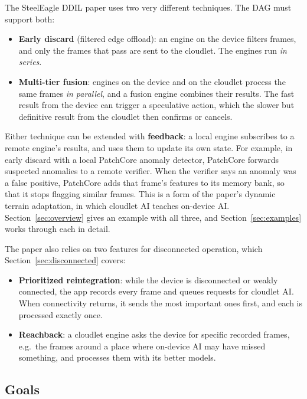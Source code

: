 \documentclass[11pt]{article}
\begin{document}
The SteelEagle DDIL paper uses two very different techniques. The DAG must
support both:
\begin{itemize}[nosep]
  \item \textbf{Early discard} (filtered edge offload): an engine on the
        device filters frames, and only the frames that pass are sent to the
        cloudlet. The engines run \emph{in series}.
  \item \textbf{Multi-tier fusion}: engines on the device and on the
        cloudlet process the same frames \emph{in parallel}, and a fusion
        engine combines their results. The fast result from the device can
        trigger a speculative action, which the slower but definitive result
        from the cloudlet then confirms or cancels.
\end{itemize}
Either technique can be extended with \textbf{feedback}: a local engine
subscribes to a remote engine's results, and uses them to update its own
state. For example, in early discard with a local PatchCore anomaly detector,
PatchCore forwards suspected anomalies to a remote verifier. When the
verifier says an anomaly was a false positive, PatchCore adds that frame's
features to its memory bank, so that it stops flagging similar frames. This
is a form of the paper's dynamic terrain adaptation, in which cloudlet AI
teaches on-device AI. Section~\ref{sec:overview} gives an example with all
three, and Section~\ref{sec:examples} works through each in detail.

The paper also relies on two features for disconnected operation, which
Section~\ref{sec:disconnected} covers:
\begin{itemize}[nosep]
  \item \textbf{Prioritized reintegration}: while the device is disconnected
        or weakly connected, the app records every frame and queues requests
        for cloudlet AI. When connectivity returns, it sends the most
        important ones first, and each is processed exactly once.
  \item \textbf{Reachback}: a cloudlet engine asks the device for specific
        recorded frames, e.g.\ the frames around a place where on-device AI
        may have missed something, and processes them with its better models.
\end{itemize}

\subsection{Goals}
\end{document}
